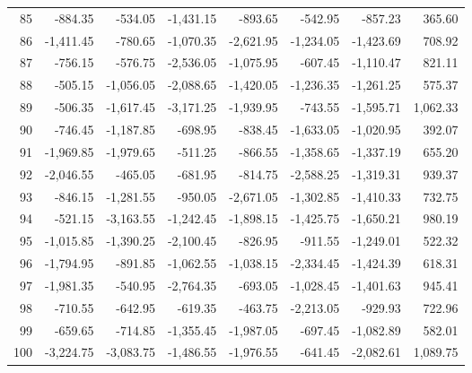\begin{longtable}{rrrrrrrr}
85 & -884.35 & -534.05 & -1,431.15 & -893.65 & -542.95 & -857.23 & 365.60  \\
86 & -1,411.45 & -780.65 & -1,070.35 & -2,621.95 & -1,234.05 & -1,423.69 & 708.92  \\
87 & -756.15 & -576.75 & -2,536.05 & -1,075.95 & -607.45 & -1,110.47 & 821.11  \\
88 & -505.15 & -1,056.05 & -2,088.65 & -1,420.05 & -1,236.35 & -1,261.25 & 575.37  \\
89 & -506.35 & -1,617.45 & -3,171.25 & -1,939.95 & -743.55 & -1,595.71 & 1,062.33  \\
90 & -746.45 & -1,187.85 & -698.95 & -838.45 & -1,633.05 & -1,020.95 & 392.07  \\
91 & -1,969.85 & -1,979.65 & -511.25 & -866.55 & -1,358.65 & -1,337.19 & 655.20  \\
92 & -2,046.55 & -465.05 & -681.95 & -814.75 & -2,588.25 & -1,319.31 & 939.37  \\
93 & -846.15 & -1,281.55 & -950.05 & -2,671.05 & -1,302.85 & -1,410.33 & 732.75  \\
94 & -521.15 & -3,163.55 & -1,242.45 & -1,898.15 & -1,425.75 & -1,650.21 & 980.19  \\
95 & -1,015.85 & -1,390.25 & -2,100.45 & -826.95 & -911.55 & -1,249.01 & 522.32  \\
96 & -1,794.95 & -891.85 & -1,062.55 & -1,038.15 & -2,334.45 & -1,424.39 & 618.31  \\
97 & -1,981.35 & -540.95 & -2,764.35 & -693.05 & -1,028.45 & -1,401.63 & 945.41  \\
98 & -710.55 & -642.95 & -619.35 & -463.75 & -2,213.05 & -929.93 & 722.96  \\
99 & -659.65 & -714.85 & -1,355.45 & -1,987.05 & -697.45 & -1,082.89 & 582.01  \\
100 & -3,224.75 & -3,083.75 & -1,486.55 & -1,976.55 & -641.45 & -2,082.61 & 1,089.75  \\

\end{longtable}

